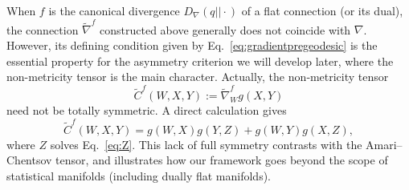 \documentclass{amsart}
\theoremstyle{definition}
\begin{document}
When $f$ is the canonical divergence $D_\nabla(q||\cdot)$ of a flat connection (or its dual), the connection $\tilde\nabla^f$ constructed above generally does not coincide with $\nabla$. However, its defining condition given by Eq.~\eqref{eq:gradientpregeodesic} 
is the essential property for the asymmetry criterion we will develop later, where the non-metricity tensor is the main character. Actually, the non‑metricity tensor 
$$\tilde C^f(W,X,Y) := \tilde \nabla^f_W g(X,Y)$$ 
need not be totally symmetric. A direct calculation gives
\begin{equation}\label{eq:nonmetricity}
    \tilde C^f(W,X,Y) = g(W,X)g(Y,Z) + g(W,Y)g(X,Z),
\end{equation}
where $Z$ solves Eq.~\eqref{eq:Z}. This lack of full symmetry contrasts with the Amari–Chentsov tensor, and illustrates how our framework goes beyond the scope of statistical manifolds (including dually flat manifolds).

\end{document}
